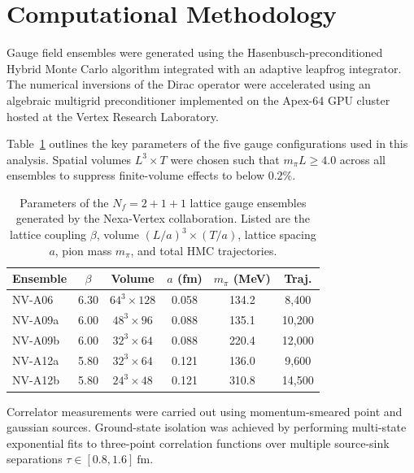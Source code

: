 \documentclass{proc}
\begin{document}
\section{Computational Methodology}
Gauge field ensembles were generated using the Hasenbusch-preconditioned Hybrid Monte Carlo algorithm integrated with an adaptive leapfrog integrator. The numerical inversions of the Dirac operator were accelerated using an algebraic multigrid preconditioner implemented on the Apex-64 GPU cluster hosted at the Vertex Research Laboratory.

Table~\ref{tab:ensembles} outlines the key parameters of the five gauge configurations used in this analysis. Spatial volumes $L^3 \times T$ were chosen such that $m_\pi L \ge 4.0$ across all ensembles to suppress finite-volume effects to below $0.2\%$.

\begin{table}[t]
\caption{Parameters of the $N_f = 2+1+1$ lattice gauge ensembles generated by the Nexa-Vertex collaboration. Listed are the lattice coupling $\beta$, volume $(L/a)^3 \times (T/a)$, lattice spacing $a$, pion mass $m_\pi$, and total HMC trajectories.}
\label{tab:ensembles}
\vspace{4pt}
\centering
\small
\setlength{\tabcolsep}{3pt}
\begin{tabular}{lccccc}
\toprule
Ensemble & $\beta$ & Volume & $a$ (fm) & $m_\pi$ (MeV) & Traj. \\
\midrule
NV-A06   & 6.30 & $64^3 \times 128$ & 0.058 & 134.2 & 8,400 \\{}
NV-A09a  & 6.00 & $48^3 \times 96$  & 0.088 & 135.1 & 10,200 \\{}
NV-A09b  & 6.00 & $32^3 \times 64$  & 0.088 & 220.4 & 12,000 \\{}
NV-A12a  & 5.80 & $32^3 \times 64$  & 0.121 & 136.0 & 9,600 \\{}
NV-A12b  & 5.80 & $24^3 \times 48$  & 0.121 & 310.8 & 14,500 \\
\bottomrule
\end{tabular}
\end{table}

Correlator measurements were carried out using momentum-smeared point and gaussian sources. Ground-state isolation was achieved by performing multi-state exponential fits to three-point correlation functions over multiple source-sink separations $\tau \in [0.8, 1.6]~\text{fm}$.
\end{document}
